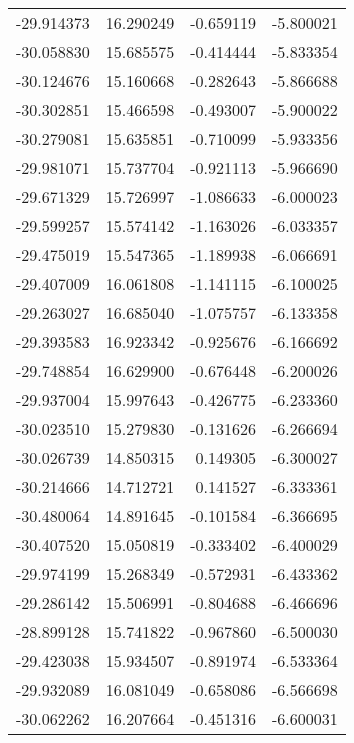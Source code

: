 \begin{tabular}{rrrr}
      -29.914373 &        16.290249 &   -0.659119 &  -5.800021 \\
      -30.058830 &        15.685575 &   -0.414444 &  -5.833354 \\
      -30.124676 &        15.160668 &   -0.282643 &  -5.866688 \\
      -30.302851 &        15.466598 &   -0.493007 &  -5.900022 \\
      -30.279081 &        15.635851 &   -0.710099 &  -5.933356 \\
      -29.981071 &        15.737704 &   -0.921113 &  -5.966690 \\
      -29.671329 &        15.726997 &   -1.086633 &  -6.000023 \\
      -29.599257 &        15.574142 &   -1.163026 &  -6.033357 \\
      -29.475019 &        15.547365 &   -1.189938 &  -6.066691 \\
      -29.407009 &        16.061808 &   -1.141115 &  -6.100025 \\
      -29.263027 &        16.685040 &   -1.075757 &  -6.133358 \\
      -29.393583 &        16.923342 &   -0.925676 &  -6.166692 \\
      -29.748854 &        16.629900 &   -0.676448 &  -6.200026 \\
      -29.937004 &        15.997643 &   -0.426775 &  -6.233360 \\
      -30.023510 &        15.279830 &   -0.131626 &  -6.266694 \\
      -30.026739 &        14.850315 &    0.149305 &  -6.300027 \\
      -30.214666 &        14.712721 &    0.141527 &  -6.333361 \\
      -30.480064 &        14.891645 &   -0.101584 &  -6.366695 \\
      -30.407520 &        15.050819 &   -0.333402 &  -6.400029 \\
      -29.974199 &        15.268349 &   -0.572931 &  -6.433362 \\
      -29.286142 &        15.506991 &   -0.804688 &  -6.466696 \\
      -28.899128 &        15.741822 &   -0.967860 &  -6.500030 \\
      -29.423038 &        15.934507 &   -0.891974 &  -6.533364 \\
      -29.932089 &        16.081049 &   -0.658086 &  -6.566698 \\
      -30.062262 &        16.207664 &   -0.451316 &  -6.600031 \\

\end{tabular}
